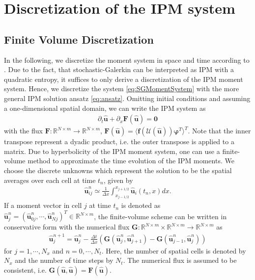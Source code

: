 \section{Discretization of the IPM system}
\label{sec:framework}
\subsection{Finite Volume Discretization}
In the following, we discretize the moment system in space and time according to \cite{kusch2017maximum}. Due to the fact, that stochastic-Galerkin can be interpreted as IPM with a quadratic entropy, it suffices to only derive a discretization of the IPM moment system. Hence, we discretize the system \eqref{eq:SGMomentSystem} with the more general IPM solution ansatz \eqref{eq:ansatz}.  
Omitting initial conditions and assuming a one-dimensional spatial domain, we can write the IPM system  as
\begin{align*}
\partial_t \bm{\hat u}+\partial_x \bm{F}(\bm{\hat u}) = \bm{0}
\end{align*}
with the flux $\bm{F}:\mathbb{R}^{N\times m}\to\mathbb{R}^{N\times m}$, $\bm{F}(\bm{\hat u})=\langle \bm f(\mathcal{U}(\bm{\hat u}))\bm{\varphi}^T \rangle^T$. Note that the inner transpose represent a dyadic product, i.e. the outer transpose is applied to a matrix. Due to hyperbolicity of the IPM moment system, one can use a finite-volume method to approximate the time evolution of the IPM moments. We choose the discrete unknowns which represent the solution to be the spatial averages over each cell at time $t_n$, given by
\begin{align*}
\bm{\hat u}_{ij}^n \simeq \frac{1}{\Delta x}\int_{x_{j-1/ 2}}^{x_{j+1/ 2}}\bm{\hat u}_i(t_n,x) dx.
\end{align*}
If a moment vector in cell $j$ at time $t_n$ is denoted as $\bm{\hat u}_j^n = (\bm{\hat u}_{0j}^n,\cdots,\bm{\hat u}_{Nj}^n)^T\in\mathbb{R}^{N\times m}$, the finite-volume scheme can be written in conservative form with the numerical flux $\bm{G}:\mathbb{R}^{N\times m}\times\mathbb{R}^{N\times m}\to\mathbb{R}^{N\times m}$ as
\begin{align}\label{eq:IPMDiscretization}
\bm{\hat u}_{j}^{n+1} = \bm{\hat u}_{j}^{n}  - \frac{\Delta t}{\Delta x}\left( \bm{G}(\bm{\hat u}_{j}^{n},\bm{\hat u}_{j+1}^{n})- \bm{G}(\bm{\hat u}_{j-1}^{n},\bm{\hat u}_{j}^{n})\right)
\end{align}
for $j = 1,\cdots,N_x$ and $n = 0,\cdots,N_t$. Here, the number of spatial cells is denoted by $N_x$ and the number of time steps by $N_t$.
The numerical flux is assumed to be consistent, i.e. $\bm{G}(\bm{\hat{u}},\bm{\hat{u}})=\bm{F}(\bm{\hat{u}})$.

